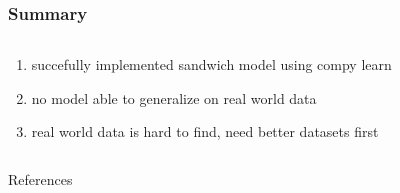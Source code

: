 \documentclass[169,xcolor=table]{beamer}
\begin{document}
\begin{frame}\frametitle{Summary}
  \begin{columns}
    \begin{column}{0.5\textwidth}
      \begin{enumerate}
        \item succefully implemented sandwich model using compy learn
        \item no model able to generalize on real world data
        \item real world data is hard to find, need better datasets first
      \end{enumerate}
    \end{column}
    \begin{column}{0.5\textwidth}
    \end{column}
  \end{columns}
\end{frame}

\appendix

\begin{frame}[allowframebreaks]{References}
  \printbibliography
\end{frame}
\end{document}
